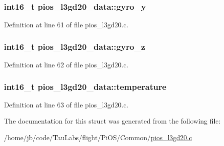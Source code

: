 \hypertarget{structpios__l3gd20__data_a2254f9fac6f52d089cd6fb6b4ac59102}{
\subsubsection[{gyro\-\_\-y}]{\setlength{\rightskip}{0pt plus 5cm}int16\-\_\-t {\bf pios\-\_\-l3gd20\-\_\-data\-::gyro\-\_\-y}}}\label{structpios__l3gd20__data_a2254f9fac6f52d089cd6fb6b4ac59102}


\-Definition at line 61 of file pios\-\_\-l3gd20.\-c.

\hypertarget{structpios__l3gd20__data_ac96a0621539a472ffc044b6246663835}{
\subsubsection[{gyro\-\_\-z}]{\setlength{\rightskip}{0pt plus 5cm}int16\-\_\-t {\bf pios\-\_\-l3gd20\-\_\-data\-::gyro\-\_\-z}}}\label{structpios__l3gd20__data_ac96a0621539a472ffc044b6246663835}


\-Definition at line 62 of file pios\-\_\-l3gd20.\-c.

\hypertarget{structpios__l3gd20__data_a51c36a0ee690ccc92f547888f0898759}{
\subsubsection[{temperature}]{\setlength{\rightskip}{0pt plus 5cm}int16\-\_\-t {\bf pios\-\_\-l3gd20\-\_\-data\-::temperature}}}\label{structpios__l3gd20__data_a51c36a0ee690ccc92f547888f0898759}


\-Definition at line 63 of file pios\-\_\-l3gd20.\-c.



\-The documentation for this struct was generated from the following file\-:\begin{DoxyCompactItemize}
\item 
/home/jb/code/\-Tau\-Labs/flight/\-Pi\-O\-S/\-Common/\hyperlink{pios__l3gd20_8c}{pios\-\_\-l3gd20.\-c}\end{DoxyCompactItemize}
